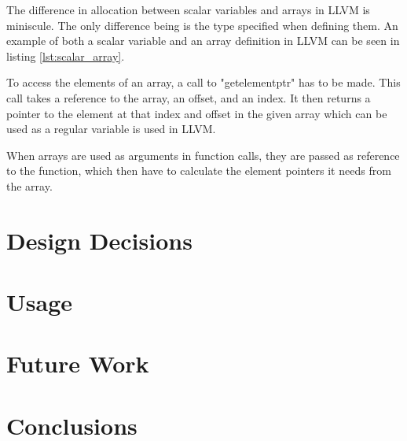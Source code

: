 The difference in allocation between scalar variables and arrays in LLVM is miniscule. The only difference being is the type specified when defining them. An example of both a scalar variable and an array definition in LLVM can be seen in listing \ref{lst:scalar_array}.

To access the elements of an array, a call to "getelementptr" has to be made. This call takes a reference to the array, an offset, and an index. It then returns a pointer to the element at that index and offset in the given array which can be used as a regular variable is used in LLVM.

When arrays are used as arguments in function calls, they are passed as reference to the function, which then have to calculate the element pointers it needs from the array.




\section{Design Decisions}



\section{Usage}

\section{Future Work}

\section{Conclusions}
